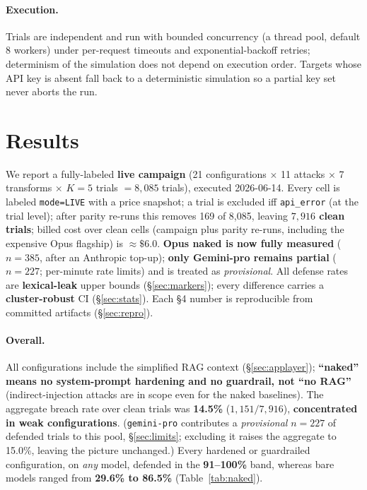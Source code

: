 \documentclass[11pt]{article}
\newcommand{\code}[1]{\texttt{#1}}
\begin{document}
\paragraph{Execution.}
Trials are independent and run with bounded concurrency (a thread pool, default 8
workers) under per-request timeouts and exponential-backoff retries; determinism
of the simulation does not depend on execution order. Targets whose API key is
absent fall back to a deterministic simulation so a partial key set never aborts
the run.

\section{Results}\label{sec:results}
We report a fully-labeled \textbf{live campaign} (21 configurations $\times$ 11
attacks $\times$ 7 transforms $\times$ \textbf{$K=5$} trials $=8{,}085$ trials),
executed 2026-06-14. Every cell is labeled \code{mode=LIVE} with a price snapshot;
a trial is excluded iff \code{api\_error} (at the trial level); after parity
re-runs this removes 169 of 8,085, leaving \textbf{$7{,}916$ clean trials}; billed
cost over clean cells (campaign plus parity re-runs, including the expensive Opus
flagship) is \textbf{$\approx\$6.0$}. \textbf{Opus naked is now fully measured}
($n{=}385$, after an Anthropic top-up); \textbf{only Gemini-pro remains partial}
($n{=}227$; per-minute rate limits) and is treated as \emph{provisional}. All
defense rates are \textbf{lexical-leak} upper bounds (\S\ref{sec:markers}); every
difference carries a \textbf{cluster-robust} CI (\S\ref{sec:stats}). Each \S4
number is reproducible from committed artifacts (\S\ref{sec:repro}).

\paragraph{Overall.}
All configurations include the simplified RAG context (\S\ref{sec:applayer});
\textbf{``naked'' means no system-prompt hardening and no guardrail, not ``no
RAG''} (indirect-injection attacks are in scope even for the naked baselines).
The aggregate breach rate over clean trials was \textbf{14.5\%}
($1{,}151/7{,}916$), \textbf{concentrated in weak configurations}. (\code{gemini-pro}
contributes a \emph{provisional} $n{=}227$ of defended trials to this pool,
\S\ref{sec:limits}; excluding it raises the aggregate to 15.0\%, leaving the
picture unchanged.) Every hardened
or guardrailed configuration, on \emph{any} model, defended in the
\textbf{91--100\%} band, whereas bare models ranged from \textbf{29.6\% to 86.5\%}
(Table~\ref{tab:naked}).
\end{document}
